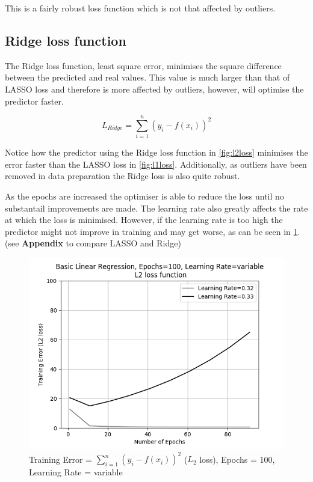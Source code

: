 \documentclass[10pt,twocolumn,letterpaper]{article}
\begin{document}
This is a fairly robust loss function which is not that affected by outliers. 

\subsection{Ridge loss function}
The Ridge loss function, least square error, minimises the square difference between the predicted and real values. This value is much larger than that of LASSO loss and therefore is more affected by outliers, however, will optimise the predictor faster.

\begin{equation}
L_{Ridge} = \sum_{i = 1}^{n} (y_i - f(x_i))^2
\label{eq:ridge}
\end{equation}

Notice how the predictor using the Ridge loss function in \ref{fig:l2loss} minimises the error faster than the LASSO loss in \ref{fig:l1loss}. Additionally, as outliers have been removed in data preparation the Ridge loss is also quite robust.

As the epochs are increased the optimiser is able to reduce the loss until no substantail improvements are made. The learning rate also greatly affects the rate at which the loss is minimised. However, if the learning rate is too high the predictor might not improve in training and may get worse, as can be seen in \ref{fig:break}. (see \textbf{Appendix} to compare LASSO and Ridge)

\begin{figure}[h]
	\begin{center}
		\includegraphics[width=0.8\linewidth]{img/linrbreak.png}
	\end{center}
	\caption{Training Error = $\sum_{i = 1}^{n} (y_i - f(x_i))^2$ ($L_2$ loss), Epochs = 100, Learning Rate = variable}
	\label{fig:break}
\end{figure}
\end{document}
